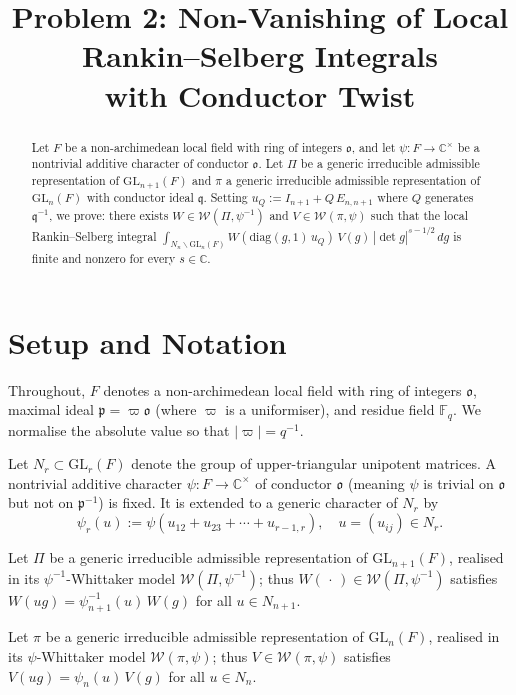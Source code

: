 \documentclass[12pt]{article}
\title{Problem 2: Non-Vanishing of Local Rankin--Selberg Integrals\\
with Conductor Twist}
\author{}
\date{}
\begin{document}
\maketitle

\begin{abstract}
Let $F$ be a non-archimedean local field with ring of integers $\mathfrak{o}$,
and let $\psi: F \to \mathbb{C}^\times$ be a nontrivial additive character of
conductor $\mathfrak{o}$.  Let $\Pi$ be a generic irreducible admissible
representation of $\mathrm{GL}_{n+1}(F)$ and $\pi$ a generic irreducible
admissible representation of $\mathrm{GL}_n(F)$ with conductor ideal
$\mathfrak{q}$.  Setting $u_Q := I_{n+1} + Q\,E_{n,n+1}$ where $Q$ generates
$\mathfrak{q}^{-1}$, we prove: there exists $W \in \mathcal{W}(\Pi,\psi^{-1})$
and $V \in \mathcal{W}(\pi,\psi)$ such that the local Rankin--Selberg integral
$\int_{N_n\backslash \mathrm{GL}_n(F)} W(\mathrm{diag}(g,1)\,u_Q)\,V(g)\,
|\det g|^{s-1/2}\,dg$ is finite and nonzero for every $s \in \mathbb{C}$.
\end{abstract}

\section{Setup and Notation}

Throughout, $F$ denotes a non-archimedean local field with ring of integers
$\mathfrak{o}$, maximal ideal $\mathfrak{p} = \varpi\mathfrak{o}$ (where
$\varpi$ is a uniformiser), and residue field $\mathbb{F}_q$.  We normalise the
absolute value so that $|\varpi| = q^{-1}$.

Let $N_r \subset \mathrm{GL}_r(F)$ denote the group of upper-triangular
unipotent matrices.  A nontrivial additive character $\psi: F \to \mathbb{C}^\times$
of conductor $\mathfrak{o}$ (meaning $\psi$ is trivial on $\mathfrak{o}$ but not
on $\mathfrak{p}^{-1}$) is fixed.  It is extended to a generic character of
$N_r$ by
\[
  \psi_r(u) := \psi(u_{12} + u_{23} + \cdots + u_{r-1,r}), \quad u = (u_{ij}) \in N_r.
\]

Let $\Pi$ be a generic irreducible admissible representation of
$\mathrm{GL}_{n+1}(F)$, realised in its $\psi^{-1}$-Whittaker model
$\mathcal{W}(\Pi,\psi^{-1})$; thus $W(\,\cdot\,) \in \mathcal{W}(\Pi,\psi^{-1})$
satisfies $W(ug) = \psi^{-1}_{n+1}(u)\,W(g)$ for all $u \in N_{n+1}$.

Let $\pi$ be a generic irreducible admissible representation of $\mathrm{GL}_n(F)$,
realised in its $\psi$-Whittaker model $\mathcal{W}(\pi,\psi)$; thus
$V \in \mathcal{W}(\pi,\psi)$ satisfies $V(ug) = \psi_n(u)\,V(g)$ for all
$u \in N_n$.
\end{document}
